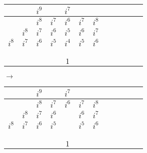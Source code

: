 \documentclass[12pt]{article}
\begin{document}
\begin{center}
\begin{tabular}{|l|c|c|c|c|c|c|c|c|c|c|r|}
    \hline
    & & $i^9$ & & $i^7$ & & \\
    \hline
    & & $i^8$ & $i^7$ & $i^6$ & $i^7$ & $i^8$\\
    \hline
    & $i^8$ & $i^7$ & $i^6$ & $i^5$ & $i^6$ & $i^7$ \\
    \hline
    $i^8$ & $i^7$ & $i^6$ & $i^5$ & $i^4$ & $i^5$ & $i^6$\\
    \hline
    & & & & & & \\
    \hline
    & & & & & & \\
    \hline
    & & & & & & \\
    \hline
    & & & & $1$ & & \\
    \hline
\end{tabular}
$\longrightarrow$
\begin{tabular}{|l|c|c|c|c|c|c|c|c|c|c|r|}
    \hline
    & & $i^9$ & & $i^7$ & & \\
    \hline
    & & $i^8$ & $i^7$ & $i^6$ & $i^7$ & $i^8$\\
    \hline
    & $i^8$ & $i^7$ & $i^6$ & & $i^6$ & $i^7$ \\
    \hline
    $i^8$ & $i^7$ & $i^6$ & $i^5$ & & $i^5$ & $i^6$\\
    \hline
    & & & & \color{red}{$i^3$} & & \\
    \hline
    & & & & & & \\
    \hline
    & & & & & & \\
    \hline
    & & & & $1$ & & \\
    \hline
\end{tabular}


\end{center}
\end{document}

